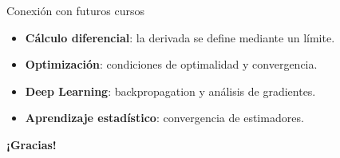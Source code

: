 \documentclass[aspectratio=169, 10pt, xcolor=table]{beamer}
\begin{document}
\begin{frame}{Conexión con futuros cursos}
    \begin{itemize}
        \item \textbf{Cálculo diferencial}: la derivada se define mediante un límite.
        \item \textbf{Optimización}: condiciones de optimalidad y convergencia.
        \item \textbf{Deep Learning}: backpropagation y análisis de gradientes.
        \item \textbf{Aprendizaje estadístico}: convergencia de estimadores.
    \end{itemize}
\end{frame}

\begin{frame}
    \centering
    \Huge \textbf{¡Gracias!}

\end{frame}
\end{document}
